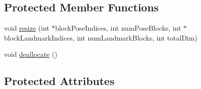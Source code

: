 \subsection*{Protected Member Functions}
\begin{DoxyCompactItemize}
\item 
void \mbox{\hyperlink{classg2o_1_1_block_solver_a0075af2df18364cf99fd80f813b8ce4b}{resize}} (int $\ast$block\+Pose\+Indices, int num\+Pose\+Blocks, int $\ast$block\+Landmark\+Indices, int num\+Landmark\+Blocks, int total\+Dim)
\item 
void \mbox{\hyperlink{classg2o_1_1_block_solver_a1877467844b7b9ab51bd6600e3a93eb0}{deallocate}} ()
\end{DoxyCompactItemize}
\subsection*{Protected Attributes}
